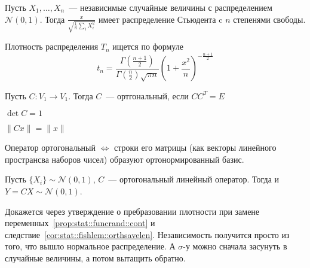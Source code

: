 \documentclass[12pt,timbord]{../../../notes}
\begin{document}
\begin{defn}\label{defn:stat::fishlem::student}
  Пусть $X_1, \dotsc, X_n$~--- независимые случайные величины с распределением $\mathcal N(0,1)$.
  Тогда $\displaystyle \frac{x}{\sqrt{\frac{1}{n} \sum_i X_i^2}}$ имеет распределение Стьюдента 
  c $n$ степенями свободы. 
\end{defn}
\begin{prop}\label{prop:stat::fishlem::studens}
  Плотность распределения $T_n$ ищется по формуле 
  \[\displaystyle t_n = \dfrac{\Gamma(\frac{n+1}{2})}{\Gamma(\frac{n}{2}) \sqrt{\pi n}} 
  \left(1+\dfrac {x^2} n\right)^{-\frac{n+1}{2} } \]
\end{prop}


\begin{defn}\label{defn:stat::fishlem::orth}
  Пусть $C\colon V_1 \to V_1$. Тогда $C$~--- ортгональный, если $C C^T = E$
\end{defn}
\begin{cor}\label{cor:stat::fishlem::orth1}
  $\det C = 1$
\end{cor}
\begin{cor}\label{cor:stat::fishlem::orthsavelen}
  $\|Cx\| = \|x\|$
\end{cor}

\begin{prop}\label{prop:stat::fishlem::orthmtx}
  Оператор ортогональный $ \Leftrightarrow $ строки его матрицы 
  (как векторы линейного пространсва наборов чисел) образуют ортонормированный базис.
\end{prop}

\begin{prop}\label{prop:stat::fishlem::orthnorm}
  Пусть $\{X_i\} \sim \mathcal N(0,1)$, $C$~--- ортогональный линейный оператор. 
  Тогда и $Y = CX \sim \mathcal N (0,1)$.
\end{prop}
\begin{itlproof}
  Докажется через утверждение о пребразовании плотности при замене 
  переменных~\ref{prop:stat::funcrand::cont} 
  и следствие~\ref{cor:stat::fishlem::orthsavelen}. Независимость получится просто из того, что
  вышло нормальное распределение. А $\sigma$-у можно сначала засунуть в случайные величины, а
  потом вытащить обратно.
\end{itlproof}
\end{document}
